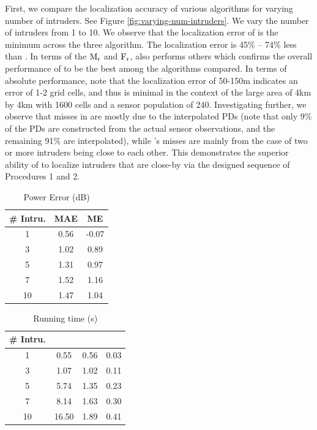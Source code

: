   First, we compare the
localization accuracy of various algorithms for varying number of
intruders.  See Figure \ref{fig:varying-num-intruders}. We vary the
number of intruders from 1 to 10. We observe that the localization
error of \ouralgo is the minimum across the three algorithm. 
The localization error is 45\% -- 74\% less than \splot.
In terms of the $\mathrm{M_{r}}$ and $\mathrm{F_{r}}$, \ouralgo also performs others which confirms the overall performance
of \ouralgo to be the best among the algorithms compared. In terms of
absolute performance, note that the localization error of 50-150m
indicates an error of 1-2 grid cells, and thus is minimal in the
context of the large area of 4km by 4km with 1600 cells and a sensor
population of 240. Investigating further, we observe that misses in
\ouralgo are mostly due to the interpolated PDs (note that only 9\% of
the PDs are constructed from the actual sensor observations, and the
remaining 91\% are interpolated), while \splot's misses are mainly
from the case of two or more intruders being close to each other. This
demonstrates the superior ability of \ouralgo to localize intruders
that are close-by via the designed sequence of Procedures 1 and 2.


\begin{table}
	\caption{\ouralgo Power Error (dB) }
	\centering
	\begin{tabular}{c c c} 
		\hline\hline
		\# Intru. & MAE & ME \\ [0.5ex]
		\hline
		1 & 0.56  & -0.07  \\ 
		3 & 1.02  & 0.89 \\
		5 & 1.31  & 0.97 \\
		7 & 1.52  & 1.16 \\
		10 & 1.47 & 1.04 \\
		\hline
	\end{tabular}
	\label{table:splat-power-error}
\end{table}

\begin{table}
	\caption{Running time (s)}
	\centering
	\begin{tabular}{c c c c}
		\hline\hline
		\# Intru. & \ouralgo & \splot & \cl \\
		\hline
		1 &  0.55 & 0.56 & 0.03\\ 
		3 &  1.07 & 1.02 & 0.11  \\
		5 &  5.74 & 1.35 & 0.23 \\
		7 &  8.14 & 1.63 & 0.30 \\
		10 & 16.50 & 1.89 & 0.41  \\
		\hline
	\end{tabular}
	\label{table:splat-running-time}	
\end{table}


